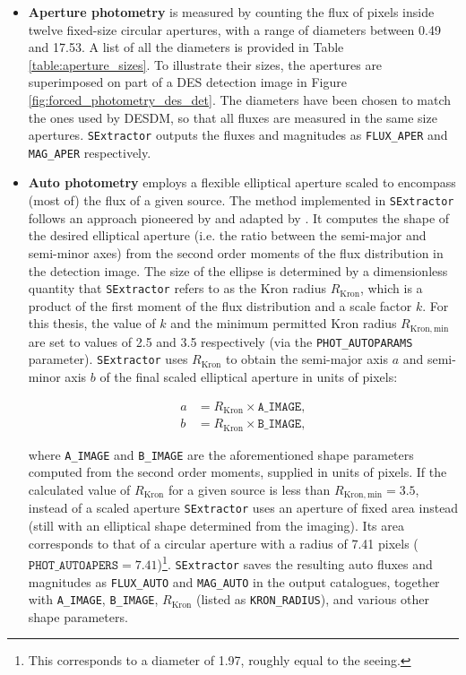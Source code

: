 \begin{itemize}
    \item \textbf{Aperture photometry} is measured by counting the flux of pixels inside twelve fixed-size circular apertures, with a range of diameters between \SI{0.49}{\arcsec} and \SI{17.53}{\arcsec}. A list of all the diameters is provided in Table \ref{table:aperture_sizes}. To illustrate their sizes, the apertures are superimposed on part of a DES detection image in Figure \ref{fig:forced_photometry_des_det}. The diameters have been chosen to match the ones used by DESDM, so that all \DESVIDEO fluxes are measured in the same size apertures.  \texttt{SExtractor} outputs the fluxes and magnitudes as \texttt{FLUX\_APER} and \texttt{MAG\_APER} respectively. 
    \item \textbf{Auto photometry} employs a flexible elliptical aperture scaled to encompass (most of) the flux of a given source. The method implemented in \texttt{SExtractor} follows an approach pioneered by \cite{1980ApJS...43..305K} and adapted by  \cite{1996A&AS..117..393B}. It computes the shape of the desired elliptical aperture (i.e. the ratio between the semi-major and semi-minor axes) from the second order moments of the flux distribution in the detection image. The size of the ellipse is determined by a dimensionless quantity that \texttt{SExtractor} refers to as the Kron radius $R_{\mathrm{Kron}}$, which is a product of the first moment of the flux distribution and a scale factor $k$. For this thesis, the value of $k$ and the minimum permitted Kron radius $R_{\mathrm{Kron,min}}$ are set to values of 2.5 and 3.5 respectively (via the \texttt{PHOT\_AUTOPARAMS} parameter). \texttt{SExtractor} uses $R_{\mathrm{Kron}}$ to obtain the semi-major axis $a$ and semi-minor axis $b$ of the final scaled elliptical aperture in units of pixels:
    
    \begin{align}
    a &= R_{\mathrm{Kron}} \times \texttt{A\_IMAGE} \label{eqn:semi_major}, \\
    b &= R_{\mathrm{Kron}} \times \texttt{B\_IMAGE},\label{eqn:semi_minor}
    \end{align}
    
    \noindent where \texttt{A\_IMAGE} and \texttt{B\_IMAGE} are the aforementioned shape parameters computed from the second order moments, supplied in units of pixels. If the calculated value of $R_{\mathrm{Kron}}$ for a given source is less than $R_{\mathrm{Kron,min}}=3.5$, instead of a scaled aperture \texttt{SExtractor} uses an aperture of fixed area instead (still with an elliptical shape determined from the imaging). Its area corresponds to that of a circular aperture with a radius of 7.41 pixels ($\texttt{PHOT\_AUTOAPERS} = 7.41$)\footnote{This corresponds to a diameter of \SI{1.97}{\arcsec}, roughly equal to the seeing.}. \texttt{SExtractor} saves the resulting auto fluxes and magnitudes as \texttt{FLUX\_AUTO} and \texttt{MAG\_AUTO} in the output catalogues, together with \texttt{A\_IMAGE}, \texttt{B\_IMAGE}, $R_{\mathrm{Kron}}$ (listed as \texttt{KRON\_RADIUS}), and various other shape parameters. 
\end{itemize}

